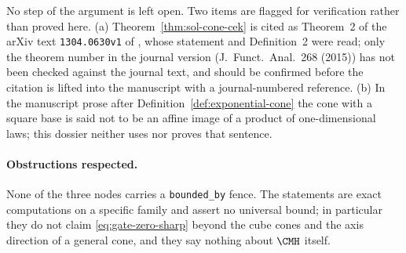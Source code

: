 \documentclass[../main.tex]{subfiles}
\begin{document}
\begin{remark}
\label{rem:sol-cone-open}
No step of the argument is left open.  Two items are flagged for verification rather than
proved here.
(a) Theorem~\ref{thm:sol-cone-cek} is cited as Theorem~2 of the arXiv text
\texttt{1304.0630v1} of \cite{CorderoErausquinKlartag2015MomentMeasures}, whose statement and
Definition~2 were read; only the theorem number in the journal version (J.~Funct.\ Anal.\ 268
(2015)) has not been checked against the journal text, and should be confirmed before the
citation is lifted into the manuscript with a journal-numbered reference.
(b) In the manuscript prose after Definition~\ref{def:exponential-cone} the cone with a square
base is said not to be an affine image of a product of one-dimensional laws; this dossier
neither uses nor proves that sentence.
\end{remark}

\paragraph{Obstructions respected.}
None of the three nodes carries a \texttt{bounded\_by} fence.  The statements are exact
computations on a specific family and assert no universal bound; in particular they do not
claim \eqref{eq:gate-zero-sharp} beyond the cube cones and the axis direction of a general
cone, and they say nothing about $\CMH$ itself.

\end{document}
